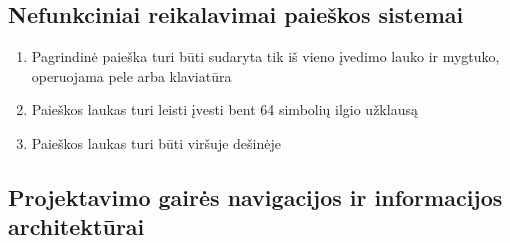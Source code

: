 \documentclass{VUMIFPSbakalaurinis}
\begin{document}
\subsection{Nefunkciniai reikalavimai paieškos sistemai}
\begin{enumerate}
	\item Pagrindinė paieška turi būti sudaryta tik iš vieno įvedimo lauko ir mygtuko, operuojama pele arba klaviatūra
	\item Paieškos laukas turi leisti įvesti bent 64 simbolių ilgio užklausą
	\item Paieškos laukas turi būti viršuje dešinėje
\end{enumerate}

\subsection{Projektavimo gairės navigacijos ir informacijos architektūrai}
\end{document}
